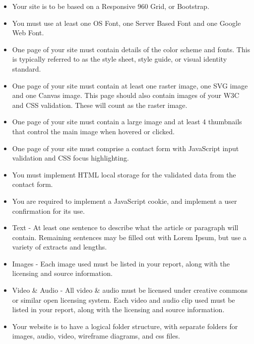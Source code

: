 \begin{itemize}
	\item Your site is to be based on a Responsive 960 Grid, or Bootstrap.
	\item You must use at least one OS Font, one Server Based Font and one Google Web Font.
	\item One page of your site must contain details of the color scheme and fonts. This is typically referred to as the style sheet, style guide, or visual identity standard. 
	\item One page of your site must contain at least one raster image, one SVG image and one Canvas image.  This page should also contain images of your W3C and CSS validation.  These will count as the raster image.
	\item One page of your site must contain a large image and at least 4 thumbnails that control the main image when hovered or clicked.
	\item One page of your site must comprise a contact form with JavaScript input validation and CSS focus highlighting.
	\item You must implement HTML local storage for the validated data from the contact form.
	\item You are required to implement a JavaScript cookie, and implement a user confirmation for its use. 
	\item Text - At least one sentence to describe what the article or paragraph will contain.  Remaining sentences may be filled out with Lorem Ipsum, but use a variety of extracts and lengths.
	\item Images - Each image used must be listed in your report, along with the licensing and source information.   
	\item Video \& Audio - All video \& audio must be licensed under creative commons or similar open licensing system.  Each video and audio clip used must be listed in your report, along with the licensing and source information.
	\item Your website is to have a logical folder structure, with separate folders for images, audio, video, wireframe diagrams, and css files. 
\end{itemize}


